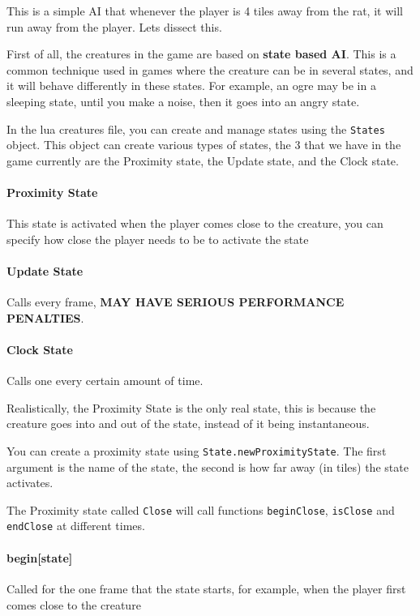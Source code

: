 \documentclass{book}
\begin{document}
This is a simple AI that whenever the player is 4 tiles away from the rat, it will run away from the player. Lets dissect this.

First of all, the creatures in the game are based on \textbf{state based AI}. This is a common technique used in games where the creature can be in several states, and it will behave differently in these states. For example, an ogre may be in a sleeping state, until you make a noise, then it goes into an angry state.

In the lua creatures file, you can create and manage states using the \texttt{States} object. This object can create various types of states, the 3 that we have in the game currently are the Proximity state, the Update state, and the Clock state.

\paragraph{Proximity State} This state is activated when the player comes close to the creature, you can specify how close the player needs to be to activate the state

\paragraph{Update State} Calls every frame, \textbf{MAY HAVE SERIOUS PERFORMANCE PENALTIES}.

\paragraph{Clock State} Calls one every certain amount of time.

Realistically, the Proximity State is the only real state, this is because the creature goes into and out of the state, instead of it being instantaneous.

You can create a proximity state using \texttt{State.newProximityState}. The first argument is the name of the state, the second is how far away (in tiles) the state activates.

The Proximity state called \texttt{Close} will call functions \texttt{beginClose}, \texttt{isClose} and \texttt{endClose} at different times.

\paragraph{begin[state]} Called for the one frame that the state starts, for example, when the player first comes close to the creature
\end{document}
